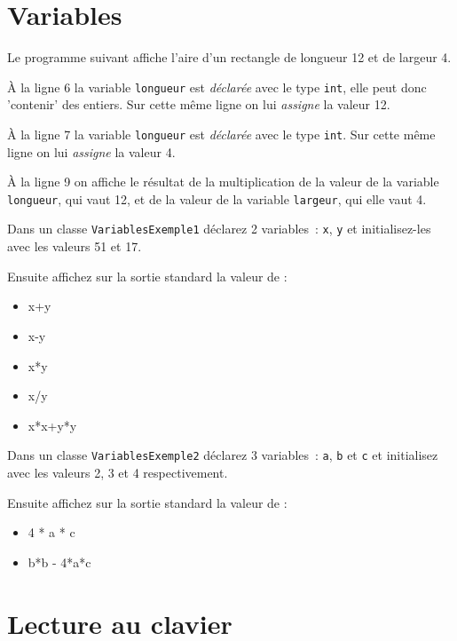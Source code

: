\documentclass[a4paper,11pt]{article}
\begin{document}
\section{Variables}

	Le programme suivant affiche l'aire d'un rectangle de longueur 12 et de largeur 4.
	

	\`A la ligne 6 la variable \texttt{longueur} est \emph{déclarée} avec le type \texttt{int}, 
	elle peut donc 'contenir' des entiers. 
	Sur cette même ligne on lui \emph{assigne} la valeur 12.  

	\`A la ligne 7 la variable \texttt{longueur} est \emph{déclarée} avec le type \texttt{int}. 
	Sur cette même ligne on lui \emph{assigne} la valeur 4.
	
	\`A la ligne 9 on affiche le résultat de la multiplication de la valeur de la variable \texttt{longueur}, 
	qui vaut 12, et de la valeur de la variable \texttt{largeur}, qui elle vaut 4.  
  



	\hspeparator

	\Exercice{} 		
		Dans un classe \texttt{VariablesExemple1} déclarez 2 variables~: 
		\texttt{x}, \texttt{y} et initialisez-les avec les valeurs 51 et 17.
		
		Ensuite affichez sur la sortie standard la valeur de :
		\begin{itemize}
		 	\item x+y
			\item x-y
			\item x*y
			\item x/y
			\item x*x+y*y
		\end{itemize} 


	\Exercice{} 
		Dans un classe \texttt{VariablesExemple2} déclarez 3 variables~: 
		\texttt{a}, \texttt{b} et \texttt{c} et initialisez avec les valeurs 2, 3 et 4 respectivement.
		
		Ensuite affichez sur la sortie standard la valeur de :
		\begin{itemize}
		 	\item 4 * a * c
			\item b*b - 4*a*c
		\end{itemize} 
	

\section{Lecture au clavier}
\end{document}

